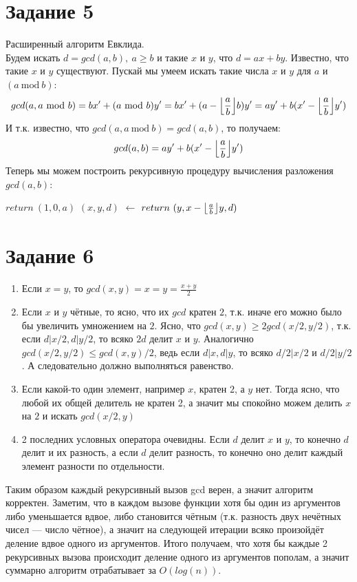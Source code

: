 \documentclass[12pt, a4paper]{article}
\makeatletter
\renewcommand{\ALG@name}{Алгоритм}
\newenvironment{procedure}[1]
  {\renewcommand*{\ALG@name}{Процедура}
  \algorithm\renewcommand{\thealgorithm}{\thechapter.\arabic{algorithm} #1}}
  {\endalgorithm}
\newcommand{\algAssign}[2]{\State #1 $\leftarrow$ #2}
\DeclarePairedDelimiter\floor{\lfloor}{\rfloor}
\newcommand{\task}[1]{\section*{Задание #1}}
\newcommand{\cd}[1]{\textsf{#1}}
\newcommand{\md}[2]{#1~\text{mod}~#2}
\makeatother
\begin{document}
\task{5} Расширенный алгоритм Евклида.\\
Будем искать $d = gcd(a, b),\ a \geq b$ и такие $x$ и $y$, что $d = ax+by$. Известно, что
такие $x$ и $y$ существуют. Пускай мы умеем искать такие числа $x$ и $y$ для $a$ и $(\md{a}{b})$: 
\[ gcd(a, \md{a}{b}) = bx'+(\md{a}{b})y' = bx' + (a - \floor*{\frac{a}{b}}b)y' = ay' + b(x'-\floor*{\frac{a}{b}}y') \]
И т.к. известно, что $gcd(a, \md{a}{b}) = gcd(a, b)$, то получаем:
\[
	gcd(a, b) = ay' + b(x'-\floor*{\frac{a}{b}}y')
\]
Теперь мы можем построить рекурсивную процедуру вычисления разложения $gcd(a,b)$:
\begin{procedure}{SuperEuclid}
  \begin{algorithmic}[1]
			\State $return~(1, 0, a)$
		\EndIf
        \algAssign{$(x, y, d)$}{\Call{SuperEuclid}{$b, \md{a}{b}$}} 
        \State $return~(y, x-\floor*{\frac{a}{b}}y, d)$
    \EndProcedure
  \end{algorithmic}
\end{procedure}

\task{6} 
\begin{enumerate}
\item Если $x=y$, то $gcd(x,y)=x=y=\frac{x+y}{2}$
\item Если $x$ и $y$ чётные, то ясно, что их $gcd$ кратен $2$, т.к. иначе его можно было бы увеличить
умножением на $2$. Ясно, что $gcd(x, y) \geq 2gcd(x/2,y/2)$, т.к. если $d | x/2, d | y/2$, то всяко $2d$ делит $x$ и $y$. 
Аналогично $gcd(x/2,y/2) \leq gcd(x, y)/2$, ведь если $d|x, d|y$, то всяко $d/2|x/2$ и $d/2|y/2$. А следовательно должно
выполняться равенство.
\item Если какой-то один элемент, например $x$, кратен $2$, а $y$ нет. Тогда ясно, что любой их общей делитель не кратен 
2, а значит мы спокойно можем делить $x$ на $2$ и искать $gcd(x/2, y)$
\item 2 последних условных оператора очевидны. Если $d$ делит $x$ и $y$, то конечно $d$ делит и их разность, а если $d$ 
делит разность, то конечно оно делит каждый элемент разности по отдельности.
\end{enumerate}
Таким образом каждый рекурсивный вызов \cd{gcd} верен, а значит алгоритм корректен. Заметим, что в каждом 
вызове функции хотя бы один из аргументов либо уменьшается вдвое, либо становится чётным (т.к. разность
двух нечётных чисел --- число чётное), а значит на следующей итерации всяко произойдёт деление вдвое одного
из аргументов. Итого получаем, что хотя бы каждые 2 рекурсивных вызова происходит деление одного из аргументов пополам, а значит суммарно алгоритм отрабатывает за $O(log(n))$.
\end{document}
